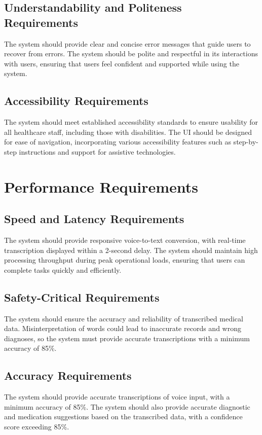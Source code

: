 \documentclass[12pt]{article}
\begin{document}
\subsection{Understandability and Politeness Requirements}
The system should provide clear and concise error messages that guide users to recover from errors. The system should be polite and respectful in its interactions with users, ensuring that users feel confident and supported while using the system.

\subsection{Accessibility Requirements}
The system should meet established accessibility standards to ensure usability for all healthcare staff, including those with disabilities. The UI should be designed for ease of navigation, incorporating various accessibility features such as step-by-step instructions and support for assistive technologies.

\section{Performance Requirements}
\subsection{Speed and Latency Requirements}
The system should provide responsive voice-to-text conversion, with real-time transcription displayed within a 2-second delay. The system should maintain high processing throughput during peak operational loads, ensuring that users can complete tasks quickly and efficiently.

\subsection{Safety-Critical Requirements}
The system should ensure the accuracy and reliability of transcribed medical data. Misinterpretation of words could lead to inaccurate records and wrong diagnoses, so the system must provide accurate transcriptions with a minimum accuracy of 85\%.

\subsection{Accuracy Requirements}
The system should provide accurate transcriptions of voice input, with a minimum accuracy of 85\%. The system should also provide accurate diagnostic and medication suggestions based on the transcribed data, with a confidence score exceeding 85\%.
\end{document}
